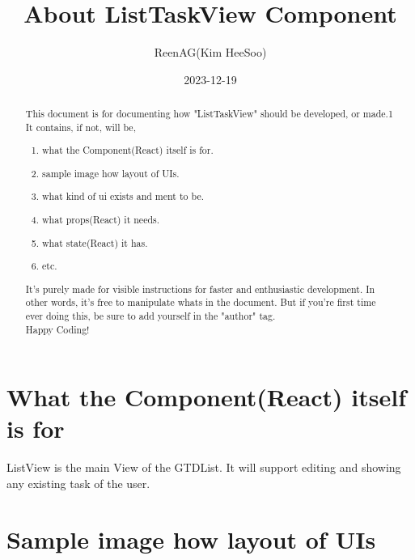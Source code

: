 \documentclass{article}
\title{About ListTaskView Component}
\date{2023-12-19}
\author{ReenAG(Kim HeeSoo)}
\begin{document}
    \maketitle
    \newpage

    \begin{abstract}
        This document is for documenting how "ListTaskView" should be developed, or made.1
        It contains, if not, will be, 
        \begin{enumerate}
            \item what the Component(React) itself is for.
            \item sample image how layout of UIs.
            \item what kind of ui exists and ment to be.
            \item what props(React) it needs.
            \item what state(React) it has.
            \item etc.
        \end{enumerate}
        It's purely made for visible instructions for faster and enthusiastic development.
        In other words, it's free to manipulate whats in the document.
        But if you're first time ever doing this, be sure to add yourself in the "author" tag.\\
        Happy Coding!
    \end{abstract}

    \section{What the Component(React) itself is for}
    ListView is the main View of the GTDList.
    It will support editing and showing any existing task of the user.

    \section{Sample image how layout of UIs}
\end{document}
